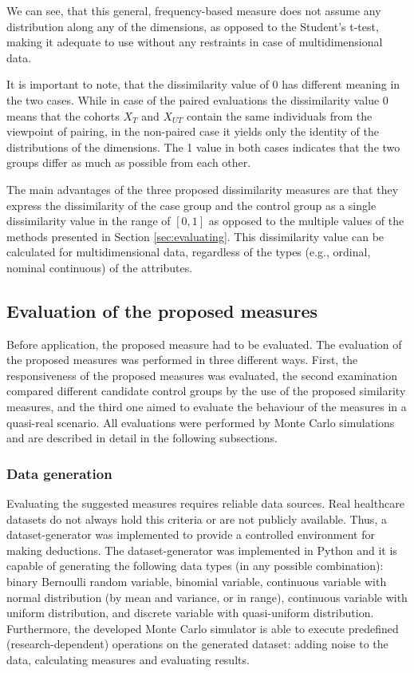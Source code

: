 We can see, that this general, frequency-based measure does not assume any distribution along any of the dimensions, as opposed to the Student's t-test, making it adequate to use without any restraints in case of multidimensional data. 

It is important to note, that the dissimilarity value of 0 has different meaning in the two cases. While in case of the paired evaluations the dissimilarity value 0 means that the cohorts $X_T$ and $X_{UT}$ contain the same individuals from the viewpoint of pairing, in the non-paired case it yields only the identity of the distributions of the dimensions. The 1 value in both cases indicates that the two groups differ as much as possible from each other.

The main advantages of the three proposed dissimilarity measures are that they express the dissimilarity of the case group and the control group as a single dissimilarity value in the range of $[0, 1]$ as opposed to the multiple values of the methods presented in Section \ref{sec:evaluating}. This dissimilarity value can be calculated for multidimensional data, regardless of the types (e.g., ordinal, nominal continuous) of the attributes.

\subsection{Evaluation of the proposed measures}
\label{sec:eval_res}

Before application, the proposed measure had to be evaluated. The evaluation of the proposed measures was performed in three different ways. First, the responsiveness of the proposed measures was evaluated, the second examination compared different candidate control groups by the use of the proposed similarity measures, and the third one aimed to evaluate the behaviour of the measures in a quasi-real scenario. All evaluations were performed by Monte Carlo simulations and are described in detail in the following subsections.

\subsubsection{Data generation}
\label{subseq:generator}

Evaluating the suggested measures requires reliable data sources. Real healthcare datasets do not always hold this criteria or are not publicly available. Thus, a dataset-generator was implemented to provide a controlled environment for making deductions. The dataset-generator was implemented in Python and it is capable of generating the following data types (in any possible combination): binary Bernoulli random variable, binomial variable, continuous variable with normal distribution (by mean and variance, or in range), continuous variable with uniform distribution, and discrete variable with quasi-uniform distribution. Furthermore, the developed Monte Carlo simulator is able to execute predefined (research-dependent) operations on the generated dataset: adding noise to the data, calculating measures and evaluating results.

